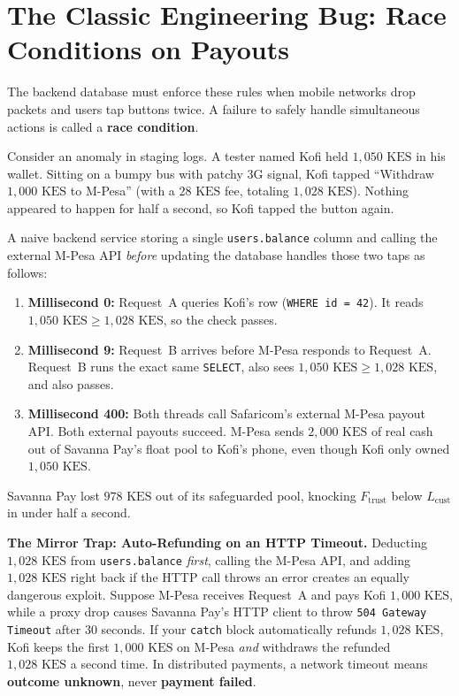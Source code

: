 \section{The Classic Engineering Bug: Race Conditions on Payouts}

The backend database must enforce these rules when mobile networks drop packets and users tap buttons twice. A failure to safely handle simultaneous actions is called a \textbf{race condition}.

Consider an anomaly in staging logs. A tester named Kofi held $1{,}050\text{ KES}$ in his wallet. Sitting on a bumpy bus with patchy 3G signal, Kofi tapped ``Withdraw $1{,}000\text{ KES}$ to M-Pesa'' (with a $28\text{ KES}$ fee, totaling $1{,}028\text{ KES}$). Nothing appeared to happen for half a second, so Kofi tapped the button again.

A naive backend service storing a single \texttt{users.balance} column and calling the external M-Pesa API \emph{before} updating the database handles those two taps as follows:
\begin{enumerate}
  \item \textbf{Millisecond 0:} Request~A queries Kofi's row (\texttt{WHERE id = 42}). It reads $1{,}050\text{ KES} \ge 1{,}028\text{ KES}$, so the check passes.
  \item \textbf{Millisecond 9:} Request~B arrives before M-Pesa responds to Request~A. Request~B runs the exact same \texttt{SELECT}, also sees $1{,}050\text{ KES} \ge 1{,}028\text{ KES}$, and also passes.
  \item \textbf{Millisecond 400:} Both threads call Safaricom's external M-Pesa payout API. Both external payouts succeed. M-Pesa sends $2{,}000\text{ KES}$ of real cash out of Savanna Pay's float pool to Kofi's phone, even though Kofi only owned $1{,}050\text{ KES}$.
\end{enumerate}

Savanna Pay lost $978\text{ KES}$ out of its safeguarded pool, knocking $F_{\text{trust}}$ below $L_{\text{cust}}$ in under half a second.

\begin{trapbox}
\textbf{The Mirror Trap: Auto-Refunding on an HTTP Timeout.} Deducting $1{,}028\text{ KES}$ from \texttt{users.balance} \emph{first}, calling the M-Pesa API, and adding $1{,}028\text{ KES}$ right back if the HTTP call throws an error creates an equally dangerous exploit. Suppose M-Pesa receives Request~A and pays Kofi $1{,}000\text{ KES}$, while a proxy drop causes Savanna Pay's HTTP client to throw \texttt{504 Gateway Timeout} after $30$ seconds. If your \texttt{catch} block automatically refunds $1{,}028\text{ KES}$, Kofi keeps the first $1{,}000\text{ KES}$ on M-Pesa \emph{and} withdraws the refunded $1{,}028\text{ KES}$ a second time. In distributed payments, a network timeout means \textbf{outcome unknown}, never \textbf{payment failed}.
\end{trapbox}

